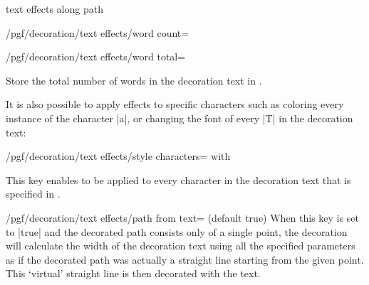 \begin{decoration}{text effects along path}
\begin{key}{/pgf/decoration/text effects/word count=}
\begin{codeexample}[]
\end{codeexample}
\end{key}

\begin{key}{/pgf/decoration/text effects/word total=}

  Store the total number of words in the decoration text in .

\end{key}


  It is also possible to apply effects to specific
  characters such as coloring every instance of the
  character |a|,
  or changing the font of every |T| in the decoration text:
  
\begin{key}{/pgf/decoration/text effects/style characters= with } 

  This key enables  to be applied to every character
  in the decoration text that is specified in .

\begin{codeexample}[]
\end{codeexample}

\end{key}

\begin{key}{/pgf/decoration/text effects/path from text= (default true)}
  When this key is set to |true| and the decorated path
  consists only of a single point, the decoration will calculate
  the width of the decoration text using all the specified parameters
  as if the decorated path was actually a straight line
  starting from the given point. This `virtual'
  straight line is then decorated with the text.
  
\begin{codeexample}[]
\begin{tikzpicture}[decoration={text effects along path,
  text={text effects along path!}, 
  text effects/.cd,
    path from text,
    character count=\i, character total=\n,
    characters={text along path, scale=\i/\n+0.5}}]
    

\end{tikzpicture}
\end{codeexample}
\end{key}
\end{decoration}

